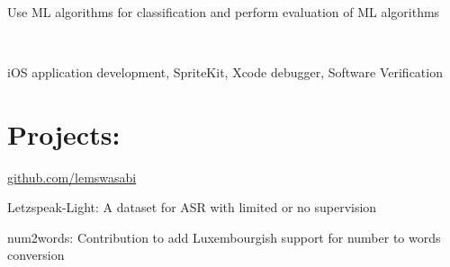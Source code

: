 \documentclass[]{curriculumvitae}
\begin{document}
\begin{minipage}[t]{0.65\textwidth}
 \\
\begin{tightemize}
	\item Use ML algorithms for classification and perform evaluation of ML algorithms
\end{tightemize}
\sectionsep

 \\
\begin{tightemize}
\item iOS application development, SpriteKit, Xcode debugger, Software Verification
\end{tightemize}
\sectionsep

\section{Projects:}

\faGithub \hspace{1em} \href{https://github.com/lemswasabi}{github.com/lemswasabi}
\begin{tightemize}
	\item Letzspeak-Light: A dataset for ASR with limited or no supervision
	\item num2words: Contribution to add Luxembourgish support for number to words conversion
\end{tightemize}

\end{minipage}
\end{document}
